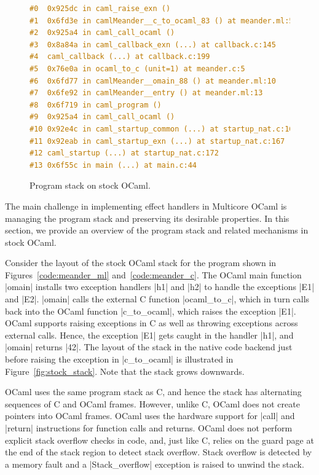 \documentclass[sigplan,10pt,review,anonymous]{acmart}\settopmatter{printfolios=true,printccs=false,printacmref=false}
\begin{document}
\begin{figure}
\begin{minipage}{0.30\linewidth}
  \label{fig:stock_stack}
\end{minipage}
%
\begin{minipage}{0.39\linewidth}
\begin{lstlisting}[language=c,basicstyle=\ttfamily\footnotesize]
#0  0x925dc in caml_raise_exn ()
#1  0x6fd3e in camlMeander__c_to_ocaml_83 () at meander.ml:5
#2  0x925a4 in caml_call_ocaml ()
#3  0x8a84a in caml_callback_exn (...) at callback.c:145
#4  caml_callback (...) at callback.c:199
#5  0x76e0a in ocaml_to_c (unit=1) at meander.c:5
#6  0x6fd77 in camlMeander__omain_88 () at meander.ml:10
#7  0x6fe92 in camlMeander__entry () at meander.ml:13
#8  0x6f719 in caml_program ()
#9  0x925a4 in caml_call_ocaml ()
#10 0x92e4c in caml_startup_common (...) at startup_nat.c:162
#11 0x92eab in caml_startup_exn (...) at startup_nat.c:167
#12 caml_startup (...) at startup_nat.c:172
#13 0x6f55c in main (...) at main.c:44
\end{lstlisting}
\vspace{-2mm}
\label{code:gdb_backtrace}
\end{minipage}
\vspace{-2mm}
\caption{Program stack on stock OCaml.}
\vspace{-2mm}
\end{figure}

The main challenge in implementing effect handlers in Multicore OCaml is
managing the program stack and preserving its desirable properties. In this
section, we provide an overview of the program stack and related mechanisms in
stock OCaml.

Consider the layout of the stock OCaml stack for the program shown in
Figures~\ref{code:meander_ml} and~\ref{code:meander_c}. The OCaml main function
|omain| installs two exception handlers |h1| and |h2| to handle the exceptions
|E1| and |E2|. |omain| calls the external C function |ocaml_to_c|, which in
turn calls back into the OCaml function |c_to_ocaml|, which raises the
exception |E1|. OCaml supports raising exceptions in C as well as throwing
exceptions across external calls. Hence, the exception |E1| gets caught in the
handler |h1|, and |omain| returns |42|. The layout of the stack in the native
code backend just before raising the exception in |c_to_ocaml| is illustrated
in Figure~\ref{fig:stock_stack}. Note that the stack grows downwards.

OCaml uses the same program stack as C, and hence the stack has
alternating sequences of C and OCaml frames. However, unlike C, OCaml does not
create pointers into OCaml frames. OCaml uses the hardware support for |call|
and |return| instructions for function calls and returns. OCaml does not
perform explicit stack overflow checks in code, and, just like C, relies on the
guard page at the end of the stack region to detect stack overflow. Stack
overflow is detected by a memory fault and a |Stack_overflow| exception is
raised to unwind the stack.
\end{document}
